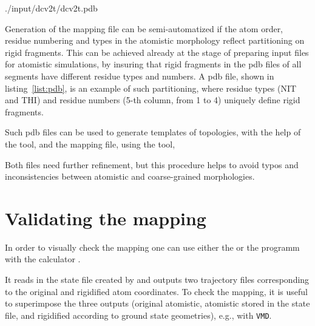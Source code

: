 %
{./input/dcv2t/dcv2t.pdb}
\vfill

Generation of the mapping file can be semi-automatized if the atom order, residue numbering and types in the atomistic morphology reflect partitioning on rigid fragments.  This can be achieved already at the stage of preparing input files for atomistic simulations, by insuring that rigid fragments in the pdb files of all segments have   different residue types and numbers. A \dcvt pdb file, shown in listing~\ref{list:pdb}, is an example of such partitioning, where residue types (NIT and THI) and residue numbers (5-th column, from 1 to 4) uniquely define rigid fragments.

Such pdb files can be used to generate templates of \gromacs topologies, with the help of the  tool,
and the mapping file, using the  tool, 

Both files need further refinement, but this procedure helps to avoid typos and inconsistencies between atomistic and coarse-grained morphologies.


\section{Validating the mapping}
In order to visually check the mapping one can use either the  \calculator or the programm \ctpdump with the calculator .

\label{sec:ctp_dump}

It reads in the state file created by \ctpmap and outputs two trajectory files corresponding to the original and rigidified atom coordinates. To check the mapping, it is useful to superimpose the three outputs (original atomistic, atomistic stored in the state file, and rigidified according to ground state geometries), e.g., with {\tt VMD}.

\label{sec:tdump}

